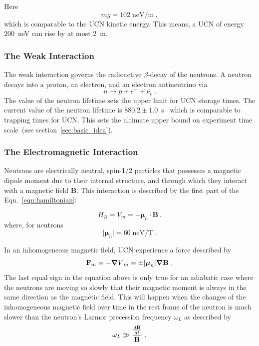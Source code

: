 Here
\begin{equation}
mg=102\; \text{neV/m}~,
\end{equation}
which is comparable to the UCN kinetic energy. This means, a UCN of
energy 200~neV can rise by at most 2~m.

\subsubsection{The Weak Interaction}
The weak interaction governs the radioactive $\beta$-decay of the
neutrons. A neutron decays into a proton, an electron, and an electron
antineutrino via
\label{neutrondecay}
\begin{equation}
n\longrightarrow p+e^{-}+\bar{\nu_{e}}~.
\end{equation}
The value of the neutron lifetime sets the upper limit for UCN storage
times. The current value of the neutron lifetime is
$880.2 \pm 1.0$~s~\cite{PDG2018} which is comparable to trapping times
for UCN. This sets the ultimate upper bound on experiment time
scale~(see section~\ref{sec:basic_idea}).

\subsubsection{The Electromagnetic Interaction}

Neutrons are electrically neutral, spin-1/2 particles that possesses a
magnetic dipole moment due to their internal structure, and through
which they interact with a magnetic field \textbf{B}.  This
interaction is described by the first part of the
Eqn.~\ref{eqn:hamiltonian}:

\begin{equation}
  \label{eqn:vmag}
H_B = V_m=-\boldsymbol{\mu}_n \cdot \textbf{B}~.
\end{equation}
where, for neutrons
\begin{equation}
\vert \boldsymbol{\mu}_n \vert =60 \; \text{neV/T}~.
\end{equation}

In an inhomogeneous magnetic field, UCN experience a force described
by
\begin{equation}
  \label{eqn:fmag}
  {\bf{F}}_m = - {\boldsymbol{\nabla}V}_m = \pm \vert {\boldsymbol{\mu}}_n \vert \boldsymbol{\nabla} \bf{B}~.
\end{equation}
The last equal sign in the equation above is only true for an
adiabatic case where the neutrons are moving so slowly that
their magnetic moment is always in the same direction as the magnetic
field. This will happen when the changes of the inhomogeneous magnetic
field over time in the rest frame of the neutron is much slower than
the neutron's Larmor precession frequency $\omega_L$ as described by
\begin{equation}
\omega_L \gg \frac{\frac{d\bf{B}}{dt}}{\bf{B}}~.
\end{equation}

